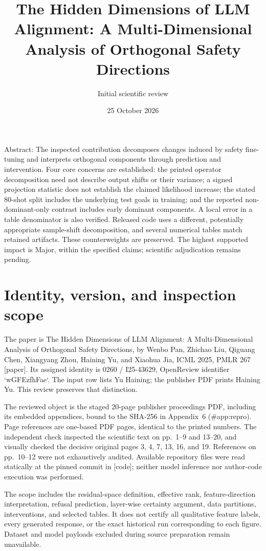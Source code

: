 \documentclass[10pt]{article}
\title{The Hidden Dimensions of LLM Alignment: A Multi-Dimensional Analysis of Orthogonal Safety Directions}
\author{Initial scientific review}
\date{25 October 2026}
\begin{document}
\maketitle
Abstract: The inspected contribution decomposes changes induced by safety fine-tuning and interprets orthogonal components through prediction and intervention. Four core concerns are established: the printed operator decomposition need not describe output shifts or their variance; a signed projection statistic does not establish the claimed likelihood increase; the stated 80-shot split includes the underlying test goals in training; and the reported non-dominant-only contrast includes early dominant components. A local error in a table denominator is also verified. Released code uses a different, potentially appropriate sample-shift decomposition, and several numerical tables match retained artifacts. These counterweights are preserved. The highest supported impact is Major, within the specified claims; scientific adjudication remains pending.\par
\section*{Identity, version, and inspection scope}
The paper is The Hidden Dimensions of LLM Alignment: A Multi-Dimensional Analysis of Orthogonal Safety Directions, by Wenbo Pan, Zhichao Liu, Qiguang Chen, Xiangyang Zhou, Haining Yu, and Xiaohua Jia, ICML 2025, PMLR 267 [paper]. Its assigned identity is 0260 / I25-43629, OpenReview identifier `wGFEzfhFae`. The input row lists Yu Haining; the publisher PDF prints Haining Yu. This review preserves that distinction.\par
The reviewed object is the staged 20-page publisher proceedings PDF, including its embedded appendices, bound to the SHA-256 in Appendix 6 (\#app:repro). Page references are one-based PDF pages, identical to the printed numbers. The independent check inspected the scientific text on pp. 1–9 and 13–20, and visually checked the decisive original pages 3, 4, 7, 13, 16, and 19. References on pp. 10–12 were not exhaustively audited. Available repository files were read statically at the pinned commit in [code]; neither model inference nor author-code execution was performed.\par
The scope includes the residual-space definition, effective rank, feature-direction interpretation, refusal prediction, layer-wise certainty argument, data partitions, interventions, and selected tables. It does not certify all qualitative feature labels, every generated response, or the exact historical run corresponding to each figure. Dataset and model payloads excluded during source preparation remain unavailable.\par
\end{document}
